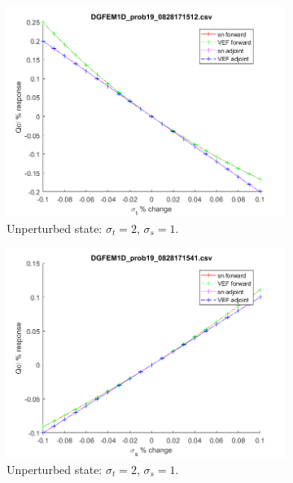 \documentclass[12pt]{report}
\newcommand{\sigt}{\sigma_t}
\newcommand{\sigs}{\sigma_s}
\begin{document}
\begin{figure}[H]
\label{HomoPerts}
\centering
\begin{subfigure}{.5\textwidth}
  \centering
  \includegraphics[width=.98\linewidth]{figures/19sigtSens.png}
  \caption{Unperturbed state: $\sigt=2$, $\sigs=1$.}
  \label{fig:sfig1}
\end{subfigure}%
\begin{subfigure}{.5\textwidth}
  \centering
  \includegraphics[width=.98\linewidth]{figures/19sigsSens.png}
  \caption{Unperturbed state: $\sigt=2$, $\sigs=1$.}
  \label{fig:sfig4}
\end{subfigure}%
\\
\begin{subfigure}{.5\textwidth}
  \centering

\end{subfigure}
\end{figure}
\end{document}
